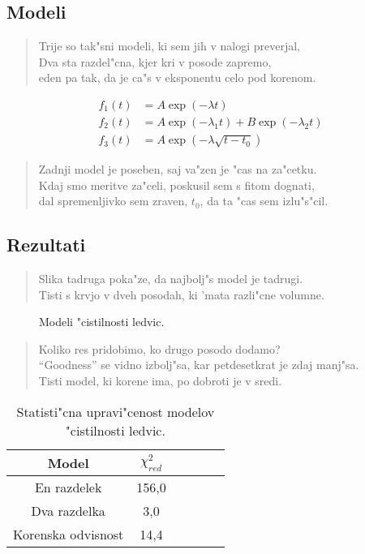 \documentclass[a4paper,10pt]{article}
\begin{document}
\subsection{Modeli}
\begin{verse}
 Trije so tak"sni modeli, ki sem jih v nalogi preverjal, \\
 Dva sta razdel"cna, kjer kri v posode zapremo, \\
 eden pa tak, da je ca"s v eksponentu celo pod korenom. 
\end{verse}

\begin{align}
 f_1(t) &= A \exp(-\lambda t) \\
 f_2(t) &= A \exp(-\lambda_1 t) + B \exp(-\lambda_2 t) \\
 f_3(t) &= A \exp(-\lambda \sqrt{t-t_0})
\end{align}

\begin{verse}
 Zadnji model je poseben, saj va"zen je "cas na za"cetku. \\
 Kdaj smo meritve za"celi, poskusil sem s fitom dognati, \\
 dal spremenljivko sem zraven, $t_0$, da ta "cas sem izlu"s"cil. 
\end{verse}

\subsection{Rezultati}

\begin{verse}
 Slika tadruga poka"ze, da najbolj"s model je tadrugi. \\
 Tisti s krvjo v dveh posodah, ki 'mata razli"cne volumne. \\
\end{verse}

\begin{figure}
 
  \caption{Modeli "cistilnosti ledvic. }
  \label{fig:ledvice}
\end{figure}

\begin{verse}
 Koliko res pridobimo, ko drugo posodo dodamo? \\
 ``Goodness'' se vidno izbolj"sa, kar petdesetkrat je zdaj manj"sa. \\
 Tisti model, ki korene ima, po dobroti je v sredi. 
\end{verse}

\begin{table}[h]
 \centering
\begin{tabular}{|c|c|c|c|c|c|}
 \hline
  Model & $\chi^2_{red}$ \\
\hline
  En razdelek & 156,0 \\
  Dva razdelka & 3,0 \\
  Korenska odvisnost & 14,4 \\
\hline
\end{tabular}
\caption{Statisti"cna upravi"cenost modelov "cistilnosti ledvic. }
\label{tab:ledvice}
\end{table}
\end{document}
